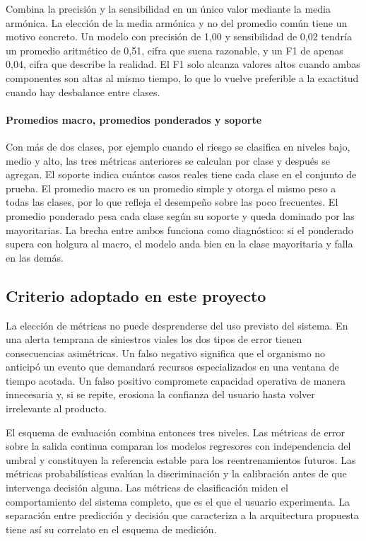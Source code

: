 Combina la precisión y la sensibilidad en un único valor mediante la media armónica. La elección de la media armónica y no del promedio común tiene un motivo concreto. Un modelo con precisión de 1,00 y sensibilidad de 0,02 tendría un promedio aritmético de 0,51, cifra que suena razonable, y un F1 de apenas 0,04, cifra que describe la realidad. El F1 solo alcanza valores altos cuando ambas componentes son altas al mismo tiempo, lo que lo vuelve preferible a la exactitud cuando hay desbalance entre clases.

\paragraph{Promedios macro, promedios ponderados y soporte}

Con más de dos clases, por ejemplo cuando el riesgo se clasifica en niveles bajo, medio y alto, las tres métricas anteriores se calculan por clase y después se agregan. El soporte indica cuántos casos reales tiene cada clase en el conjunto de prueba. El promedio macro es un promedio simple y otorga el mismo peso a todas las clases, por lo que refleja el desempeño sobre las poco frecuentes. El promedio ponderado pesa cada clase según su soporte y queda dominado por las mayoritarias. La brecha entre ambos funciona como diagnóstico: si el ponderado supera con holgura al macro, el modelo anda bien en la clase mayoritaria y falla en las demás.

\subsection{Criterio adoptado en este proyecto}

La elección de métricas no puede desprenderse del uso previsto del sistema. En una alerta temprana de siniestros viales los dos tipos de error tienen consecuencias asimétricas. Un falso negativo significa que el organismo no anticipó un evento que demandará recursos especializados en una ventana de tiempo acotada. Un falso positivo compromete capacidad operativa de manera innecesaria y, si se repite, erosiona la confianza del usuario hasta volver irrelevante al producto.

El esquema de evaluación combina entonces tres niveles. Las métricas de error sobre la salida continua comparan los modelos regresores con independencia del umbral y constituyen la referencia estable para los reentrenamientos futuros. Las métricas probabilísticas evalúan la discriminación y la calibración antes de que intervenga decisión alguna. Las métricas de clasificación miden el comportamiento del sistema completo, que es el que el usuario experimenta. La separación entre predicción y decisión que caracteriza a la arquitectura propuesta tiene así su correlato en el esquema de medición.

